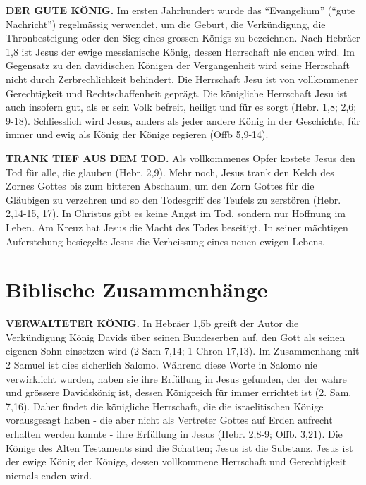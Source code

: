 \documentclass[headsepline=true]{book}
\begin{document}
\textbf{DER GUTE KÖNIG.} Im ersten Jahrhundert wurde das ``Evangelium''
(``gute Nachricht'') regelmässig verwendet, um die Geburt, die
Verkündigung, die Thronbesteigung oder den Sieg eines grossen Königs zu
bezeichnen. Nach Hebräer 1,8 ist Jesus der ewige messianische König,
dessen Herrschaft nie enden wird. Im Gegensatz zu den davidischen
Königen der Vergangenheit wird seine Herrschaft nicht durch
Zerbrechlichkeit behindert. Die Herrschaft Jesu ist von vollkommener
Gerechtigkeit und Rechtschaffenheit geprägt. Die königliche Herrschaft
Jesu ist auch insofern gut, als er sein Volk befreit, heiligt und für es
sorgt (Hebr. 1,8; 2,6; 9-18). Schliesslich wird Jesus, anders als jeder
andere König in der Geschichte, für immer und ewig als König der Könige
regieren (Offb 5,9-14).

\textbf{TRANK TIEF AUS DEM TOD.} Als vollkommenes Opfer kostete Jesus
den Tod für alle, die glauben (Hebr. 2,9). Mehr noch, Jesus trank den
Kelch des Zornes Gottes bis zum bitteren Abschaum, um den Zorn Gottes
für die Gläubigen zu verzehren und so den Todesgriff des Teufels zu
zerstören (Hebr. 2,14-15, 17). In Christus gibt es keine Angst im Tod,
sondern nur Hoffnung im Leben. Am Kreuz hat Jesus die Macht des Todes
beseitigt. In seiner mächtigen Auferstehung besiegelte Jesus die
Verheissung eines neuen ewigen Lebens.

\section{Biblische Zusammenhänge}\label{biblische-zusammenhuxe4nge-1}

\textbf{VERWALTETER KÖNIG.} In Hebräer 1,5b greift der Autor die
Verkündigung König Davids über seinen Bundeserben auf, den Gott als
seinen eigenen Sohn einsetzen wird (2 Sam 7,14; 1 Chron 17,13). Im
Zusammenhang mit 2 Samuel ist dies sicherlich Salomo. Während diese
Worte in Salomo nie verwirklicht wurden, haben sie ihre Erfüllung in
Jesus gefunden, der der wahre und grössere Davidskönig ist, dessen
Königreich für immer errichtet ist (2. Sam. 7,16). Daher findet die
königliche Herrschaft, die die israelitischen Könige vorausgesagt haben
- die aber nicht als Vertreter Gottes auf Erden aufrecht erhalten werden
konnte - ihre Erfüllung in Jesus (Hebr. 2,8-9; Offb. 3,21). Die Könige
des Alten Testaments sind die Schatten; Jesus ist die Substanz. Jesus
ist der ewige König der Könige, dessen vollkommene Herrschaft und
Gerechtigkeit niemals enden wird.
\end{document}
